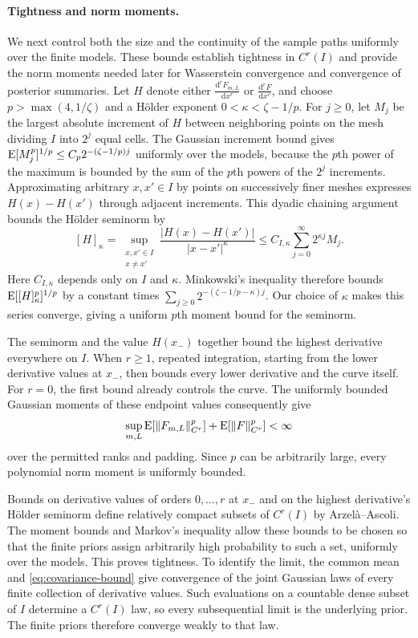 \begin{proofEnd}
\paragraph{Tightness and norm moments.}
We next control both the size and the continuity of the sample paths
uniformly over the finite models. These bounds establish tightness
in $C^r(I)$ and provide the norm moments needed later for Wasserstein
convergence and convergence of posterior summaries.
Let $H$ denote either $\frac{\mathrm{d}^rF_{m,L}}{\mathrm{d}x^r}$ or
$\frac{\mathrm{d}^rF}{\mathrm{d}x^r}$, and choose
$p>\max(4,1/\zeta)$ and a H\"older exponent $0<\kappa<\zeta-1/p$.
For $j\geq0$, let $M_j$ be the largest absolute increment of $H$
between neighboring points on the mesh dividing $I$ into $2^j$
equal cells. The Gaussian increment bound gives
$\operatorname{E}[M_j^p]^{1/p}\leq C_p2^{-(\zeta-1/p)j}$ uniformly over the models,
because the $p$th power of the maximum is bounded by the sum of the
$p$th powers of the $2^j$ increments.
Approximating arbitrary $x,x'\in I$ by points on successively finer
meshes expresses $H(x)-H(x')$ through adjacent increments.
This dyadic chaining argument bounds the H\"older seminorm by
\[
 [H]_\kappa
 =\sup_{\substack{x,x'\in I\\x\ne x'}}
      \frac{|H(x)-H(x')|}{|x-x'|^\kappa}
 \leq C_{I,\kappa}\sum_{j=0}^{\infty}2^{\kappa j}M_j.
\]
Here $C_{I,\kappa}$ depends only on $I$ and $\kappa$.
Minkowski's inequality therefore bounds $\operatorname{E}[[H]_\kappa^p]^{1/p}$
by a constant times $\sum_{j\geq0}2^{-(\zeta-1/p-\kappa)j}$.
Our choice of $\kappa$ makes this series converge, giving a uniform
$p$th moment bound for the seminorm.

The seminorm and the value $H(x_-)$ together bound the highest
derivative everywhere on $I$. When $r\geq1$, repeated integration,
starting from the lower derivative values at $x_-$, then bounds
every lower derivative and the curve itself. For $r=0$, the first
bound already controls the curve. The uniformly bounded Gaussian
moments of these endpoint values consequently give
\begin{equation}\label{eq:moments}
 \sup_{m,L}\operatorname{E}[\|F_{m,L}\|_{C^r}^p]+\operatorname{E}[\|F\|_{C^r}^p]<\infty
\end{equation}
over the permitted ranks and padding. Since $p$ can be arbitrarily
large, every polynomial norm moment is uniformly bounded.

Bounds on derivative values of orders $0,\ldots,r$ at $x_-$ and on the highest
derivative's H\"older seminorm define relatively compact subsets of
$C^r(I)$ by Arzel\`a--Ascoli. The moment bounds and Markov's inequality
allow these bounds to be chosen so that the finite priors assign
arbitrarily high probability to such a set, uniformly over the models.
This proves tightness. To identify the limit, the common mean and
\cref{eq:covariance-bound} give convergence of the joint Gaussian laws
of every finite collection of derivative values. Such evaluations on
a countable dense subset of $I$ determine a $C^r(I)$ law, so every
subsequential limit is the underlying prior. The finite priors
therefore converge weakly to that law.


\end{proofEnd}
